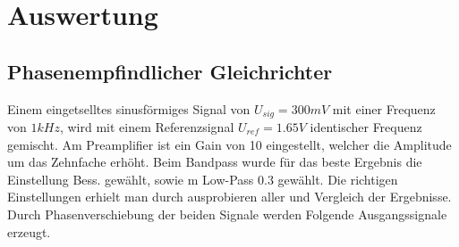 \section{Auswertung}
\label{sec:Auswertung}

\subsection{Phasenempfindlicher Gleichrichter}
\label{sec:Gleichrichter}

Einem eingetselltes sinusförmiges Signal von $U_{sig} = 300 mV$ mit einer Frequenz von $1 kHz$,
wird mit einem Referenzsignal $U_{ref} = 1.65 V$ identischer Frequenz gemischt. 
Am Preamplifier ist ein Gain von 10 eingestellt, welcher die Amplitude um das Zehnfache erhöht.
Beim Bandpass wurde für das beste Ergebnis die Einstellung Bess. gewählt, sowie m Low-Pass 0.3 gewählt.
Die richtigen Einstellungen erhielt man durch ausprobieren aller und Vergleich der Ergebnisse.
Durch Phasenverschiebung der beiden Signale werden Folgende Ausgangssignale erzeugt.

